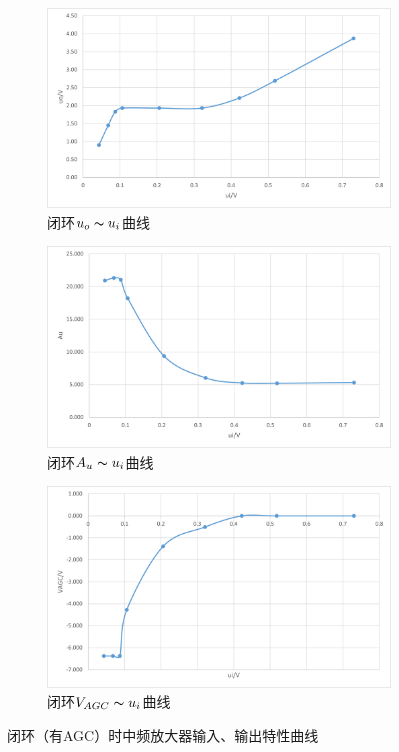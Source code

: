 \documentclass[UTF8]{ctexart}
\begin{document}
\begin{figure}[H]
    \centering
    \begin{subfigure}[c]{0.7\textwidth}
        \centering
        \includegraphics[width=\textwidth]{pics/43.png}
        \caption{闭环$u_o\thicksim u_i$曲线}\label{fig:43}
    \end{subfigure}
    \begin{subfigure}[c]{0.7\textwidth}
        \centering
        \includegraphics[width=\textwidth]{pics/44.png}
        \caption{闭环$A_u\thicksim u_i$曲线}\label{fig:44}
    \end{subfigure}

    \begin{subfigure}[c]{0.7\textwidth}
        \centering
        \includegraphics[width=\textwidth]{pics/45.png}
        \caption{闭环$V_{AGC}\thicksim u_i$曲线}\label{fig:45}
    \end{subfigure}
    \vspace{-1em}
    \caption{闭环（有AGC）时中频放大器输入、输出特性曲线}\label{fig:6}
\end{figure}
\end{document}

